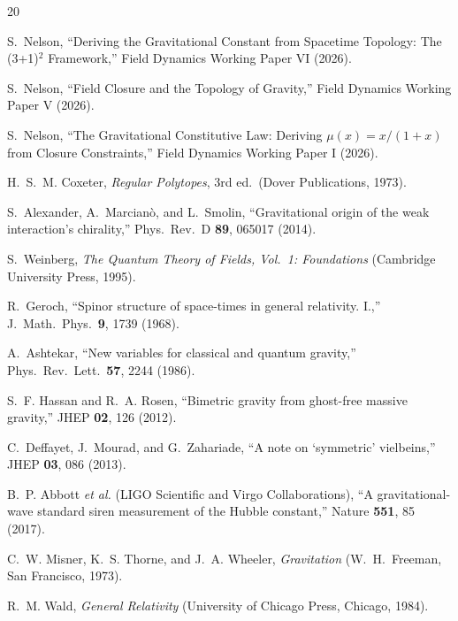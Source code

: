 \documentclass[aps,prd,preprint,superscriptaddress,showpacs,preprintnumbers,amsmath,amssymb,nofootinbib]{revtex4-2}
\begin{document}
\begin{thebibliography}{20}

S.~Nelson, ``Deriving the Gravitational Constant from Spacetime Topology: The (3+1)$^2$ Framework,'' Field Dynamics Working Paper VI (2026).

S.~Nelson, ``Field Closure and the Topology of Gravity,'' Field Dynamics Working Paper V (2026).

S.~Nelson, ``The Gravitational Constitutive Law: Deriving $\mu(x) = x/(1+x)$ from Closure Constraints,'' Field Dynamics Working Paper I (2026).

H.~S.~M. Coxeter, \emph{Regular Polytopes}, 3rd ed.\ (Dover Publications, 1973).

S.~Alexander, A.~Marcian\`o, and L.~Smolin, ``Gravitational origin of the weak interaction's chirality,'' Phys.\ Rev.\ D \textbf{89}, 065017 (2014).

S.~Weinberg, \emph{The Quantum Theory of Fields, Vol.\ 1: Foundations} (Cambridge University Press, 1995).

R.~Geroch, ``Spinor structure of space-times in general relativity. I.,'' J.\ Math.\ Phys.\ \textbf{9}, 1739 (1968).

A.~Ashtekar, ``New variables for classical and quantum gravity,'' Phys.\ Rev.\ Lett.\ \textbf{57}, 2244 (1986).

S.~F. Hassan and R.~A. Rosen, ``Bimetric gravity from ghost-free massive gravity,'' JHEP \textbf{02}, 126 (2012).

C.~Deffayet, J.~Mourad, and G.~Zahariade, ``A note on `symmetric' vielbeins,'' JHEP \textbf{03}, 086 (2013).

B.~P. Abbott \textit{et al.} (LIGO Scientific and Virgo Collaborations), ``A gravitational-wave standard siren measurement of the Hubble constant,'' Nature \textbf{551}, 85 (2017).

C.~W. Misner, K.~S. Thorne, and J.~A. Wheeler, \emph{Gravitation} (W.~H.~Freeman, San Francisco, 1973).

R.~M. Wald, \emph{General Relativity} (University of Chicago Press, Chicago, 1984).


\end{thebibliography}
\end{document}
